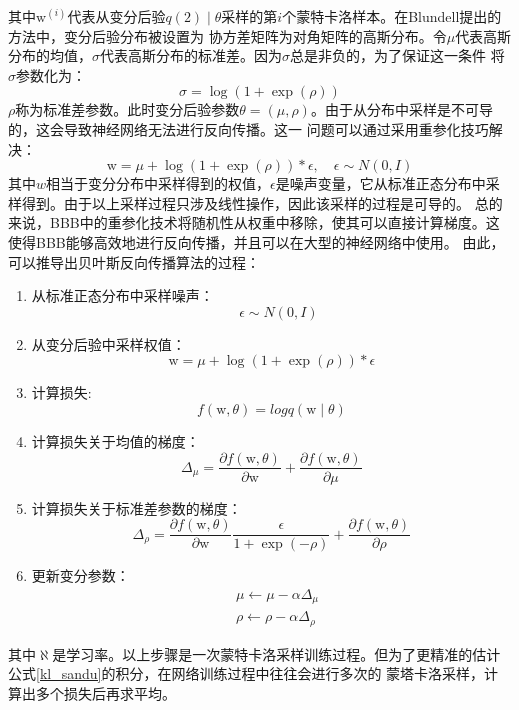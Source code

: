 其中$\mathrm{w}^{(i)}$代表从变分后验$q(\mathrm{2}) \mid \theta$采样的第$i$个蒙特卡洛样本。在Blundell提出的方法中，变分后验分布被设置为
协方差矩阵为对角矩阵的高斯分布。令$\mu$代表高斯分布的均值，$\sigma$代表高斯分布的标准差。因为$\sigma$总是非负的，为了保证这一条件
将$\sigma$参数化为：
\begin{equation}
	\label{}
	\sigma = \log (1+\exp(\rho))
\end{equation}
$\rho$称为标准差参数。此时变分后验参数$\theta=(\mu,\rho)$。由于从分布中采样是不可导的，这会导致神经网络无法进行反向传播。这一
问题可以通过采用重参化\cite{kingma2013auto}技巧解决：
\begin{equation}
	\label{}
	\mathrm{w}=\mu+\log (1+\exp (\rho)) * \epsilon, \quad \epsilon \sim N(0, I)
\end{equation}
其中$w$相当于变分分布中采样得到的权值，$\epsilon$是噪声变量，它从标准正态分布中采样得到。由于以上采样过程只涉及线性操作，因此该采样的过程是可导的。
总的来说，BBB中的重参化技术将随机性从权重中移除，使其可以直接计算梯度。这使得BBB能够高效地进行反向传播，并且可以在大型的神经网络中使用。
由此，可以推导出贝叶斯反向传播算法的过程\cite{blundell2015weight}：
\begin{enumerate}
	\item 从标准正态分布中采样噪声：
	\begin{equation}
		\label{}
		\quad \epsilon \sim N(0, I)
	\end{equation}
	\item 从变分后验中采样权值：
	\begin{equation}
		\label{}
		\mathrm{w}=\mu+\log (1+\exp (\rho)) * \epsilon
	\end{equation}
	\item 计算损失:
	\begin{equation}
		\label{}
		f(\mathrm{w},\theta)= logq(\mathrm{w}\mid\theta)
	\end{equation}
	\item 计算损失关于均值的梯度：
	\begin{equation}
		\label{}
		\Delta_\mu=\frac{\partial f(\mathrm{w}, \theta)}{\partial \mathrm{w}}+\frac{\partial f(\mathrm{w}, \theta)}{\partial \mu}
	\end{equation}
	\item 计算损失关于标准差参数的梯度：
	\begin{equation}
		\label{}
		\Delta_\rho=\frac{\partial f(\mathrm{w}, \theta)}{\partial \mathrm{w}} \frac{\epsilon}{1+\exp (-\rho)}+\frac{\partial f(\mathrm{w}, \theta)}{\partial \rho}
	\end{equation}
	\item 更新变分参数：
	\begin{equation}
		\label{}
		\begin{aligned}
		& \mu \leftarrow \mu-\alpha \Delta_\mu \\
		& \rho \leftarrow \rho-\alpha \Delta_\rho
		\end{aligned}
	\end{equation}
\end{enumerate}
其中$\aleph$是学习率。以上步骤是一次蒙特卡洛采样训练过程。但为了更精准的估计公式\eqref{kl_sandu}的积分，在网络训练过程中往往会进行多次的
蒙塔卡洛采样，计算出多个损失后再求平均。

